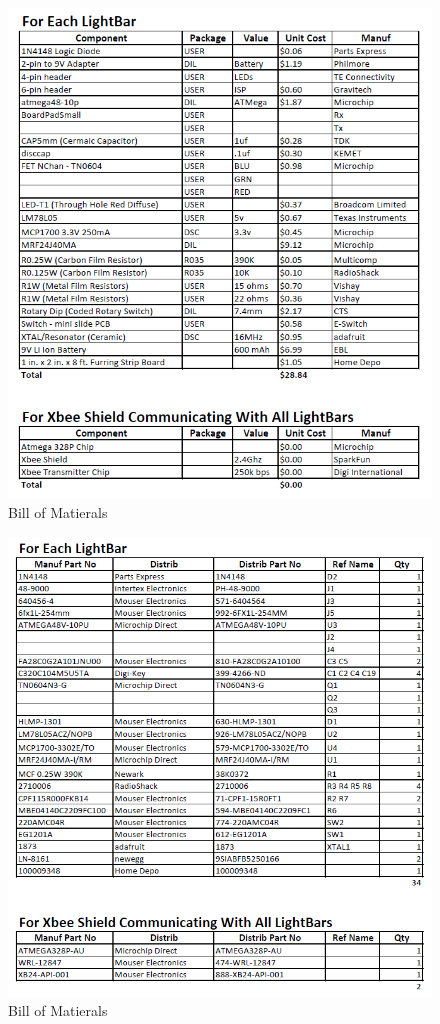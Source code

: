 \documentclass[12pt]{article}
\begin{document}
{{{{			\begin{figure}[ht!]
				\centering
				\includegraphics[width=170mm]{assets/Bill_of_Materials_Pg1.png}
				\caption{Bill of Matierals}
			\end{figure}
			
			\begin{figure}[ht!]
				\centering
				\includegraphics[width=170mm]{assets/Bill_of_Materials_Pg2.png}
				\caption{Bill of Matierals}
			\end{figure}
		
}}}}
\end{document}

